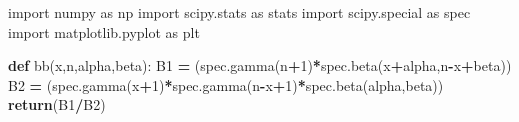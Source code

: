 \documentclass[polish,]{book}
\newenvironment{Shaded}{\begin{snugshade}}{\end{snugshade}}
\newcommand{\ControlFlowTok}[1]{\textcolor[rgb]{0.13,0.29,0.53}{\textbf{#1}}}
\newcommand{\DecValTok}[1]{\textcolor[rgb]{0.00,0.00,0.81}{#1}}
\newcommand{\ImportTok}[1]{#1}
\newcommand{\KeywordTok}[1]{\textcolor[rgb]{0.13,0.29,0.53}{\textbf{#1}}}
\newcommand{\NormalTok}[1]{#1}
\newcommand{\OperatorTok}[1]{\textcolor[rgb]{0.81,0.36,0.00}{\textbf{#1}}}
\begin{document}
\begin{Shaded}
\begin{Highlighting}[]
\ImportTok{import}\NormalTok{ numpy }\ImportTok{as}\NormalTok{ np}
\ImportTok{import}\NormalTok{ scipy.stats }\ImportTok{as}\NormalTok{ stats}
\ImportTok{import}\NormalTok{ scipy.special }\ImportTok{as}\NormalTok{ spec}
\ImportTok{import}\NormalTok{ matplotlib.pyplot }\ImportTok{as}\NormalTok{ plt}

\KeywordTok{def}\NormalTok{ bb(x,n,alpha,beta):}
\NormalTok{    B1 }\OperatorTok{=}\NormalTok{ (spec.gamma(n}\OperatorTok{+}\DecValTok{1}\NormalTok{)}\OperatorTok{*}\NormalTok{spec.beta(x}\OperatorTok{+}\NormalTok{alpha,n}\OperatorTok{-}\NormalTok{x}\OperatorTok{+}\NormalTok{beta))}
\NormalTok{    B2 }\OperatorTok{=}\NormalTok{ (spec.gamma(x}\OperatorTok{+}\DecValTok{1}\NormalTok{)}\OperatorTok{*}\NormalTok{spec.gamma(n}\OperatorTok{-}\NormalTok{x}\OperatorTok{+}\DecValTok{1}\NormalTok{)}\OperatorTok{*}\NormalTok{spec.beta(alpha,beta))}
    \ControlFlowTok{return}\NormalTok{(B1}\OperatorTok{/}\NormalTok{B2)}


\end{Highlighting}
\end{Shaded}
\end{document}
